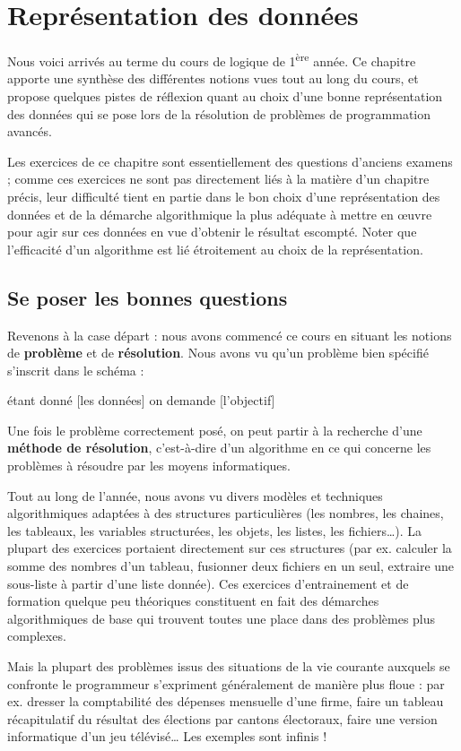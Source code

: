 

\chapter{Représentation des données}
{
Nous voici arrivés au terme du cours de logique de
1\textsuperscript{ère} année. Ce chapitre apporte une synthèse des
différentes notions vues tout au long du cours, et propose quelques
pistes de réflexion quant au choix d’une bonne représentation des
données qui se pose lors de la résolution de problèmes de programmation
avancés.}

{
Les exercices de ce chapitre sont essentiellement des questions
d’anciens examens ; comme ces exercices ne sont pas directement liés à
la matière d’un chapitre précis, leur difficulté tient en partie dans
le bon choix d’une représentation des données et de la démarche
algorithmique la plus adéquate à mettre en œuvre pour agir sur ces
données en vue d’obtenir le résultat escompté. Noter que l’efficacité
d’un algorithme est lié étroitement au choix de la représentation.}

\section{Se poser les bonnes questions}
{
Revenons à la case départ : nous avons commencé ce cours en situant les
notions de \textbf{problème} et de \textbf{résolution}. Nous avons vu
qu’un problème bien spécifié s’inscrit dans le schéma :}

{
étant donné [les données] on demande [l’objectif]}

{
Une fois le problème correctement posé, on peut partir à la recherche
d’une \textbf{méthode de résolution}, c’est-à-dire d’un algorithme en
ce qui concerne les problèmes à résoudre par les moyens informatiques.}

{
Tout au long de l’année, nous avons vu divers modèles et techniques
algorithmiques adaptées à des structures particulières (les nombres,
les chaines, les tableaux, les variables structurées, les objets, les
listes, les fichiers…). La plupart des exercices portaient directement
sur ces structures (par ex. calculer la somme des nombres d’un tableau,
fusionner deux fichiers en un seul, extraire une sous-liste à partir
d’une liste donnée). Ces exercices d’entrainement et de formation
quelque peu théoriques constituent en fait des démarches algorithmiques
de base qui trouvent toutes une place dans des problèmes plus
complexes.}

{
Mais la plupart des problèmes issus des situations de la vie courante
auxquels se confronte le programmeur s’expriment généralement de
manière plus floue : par ex. dresser la comptabilité des dépenses
mensuelle d’une firme, faire un tableau récapitulatif du résultat des
élections par cantons électoraux, faire une version informatique d’un
jeu télévisé… Les exemples sont infinis ! }

